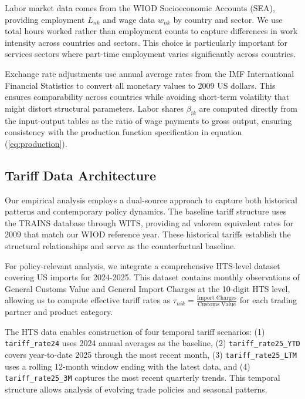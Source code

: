 Labor market data comes from the WIOD Socioeconomic Accounts (SEA), providing employment $L_{nk}$ and wage data $w_{nk}$ by country and sector. We use total hours worked rather than employment counts to capture differences in work intensity across countries and sectors. This choice is particularly important for services sectors where part-time employment varies significantly across countries.

Exchange rate adjustments use annual average rates from the IMF International Financial Statistics to convert all monetary values to 2009 US dollars. This ensures comparability across countries while avoiding short-term volatility that might distort structural parameters. Labor shares $\beta_{ik}$ are computed directly from the input-output tables as the ratio of wage payments to gross output, ensuring consistency with the production function specification in equation (\ref{eq:production}).

\subsection{Tariff Data Architecture}

Our empirical analysis employs a dual-source approach to capture both historical patterns and contemporary policy dynamics. The baseline tariff structure uses the TRAINS database through WITS, providing ad valorem equivalent rates for 2009 that match our WIOD reference year. These historical tariffs establish the structural relationships and serve as the counterfactual baseline.

For policy-relevant analysis, we integrate a comprehensive HTS-level dataset covering US imports for 2024-2025. This dataset contains monthly observations of General Customs Value and General Import Charges at the 10-digit HTS level, allowing us to compute effective tariff rates as $\tau_{nik} = \frac{\text{Import Charges}}{\text{Customs Value}}$ for each trading partner and product category.

The HTS data enables construction of four temporal tariff scenarios: (1) \texttt{tariff\_rate24} uses 2024 annual averages as the baseline, (2) \texttt{tariff\_rate25\_YTD} covers year-to-date 2025 through the most recent month, (3) \texttt{tariff\_rate25\_LTM} uses a rolling 12-month window ending with the latest data, and (4) \texttt{tariff\_rate25\_3M} captures the most recent quarterly trends. This temporal structure allows analysis of evolving trade policies and seasonal patterns.

